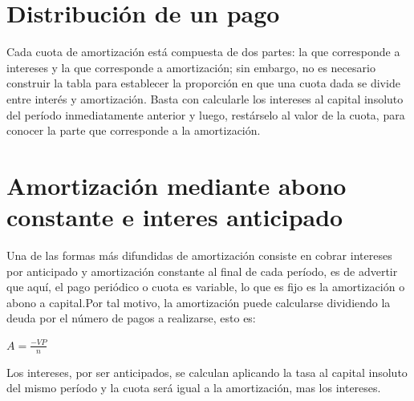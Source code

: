 	\section{Distribución de un pago}
	
	Cada cuota de amortización está compuesta de dos partes: la que corresponde a intereses y la que corresponde a amortización; sin embargo, no es necesario construir la tabla para establecer la proporción en que una cuota dada se divide entre interés y amortización. Basta con calcularle los intereses al capital insoluto del período inmediatamente anterior y luego, restárselo al valor de la cuota, para conocer la parte que corresponde a la amortización. \\
	
	
 
	
	
	\section{Amortización mediante abono constante e interes anticipado}
	
	Una de las formas más difundidas de amortización consiste en cobrar intereses por anticipado y amortización constante al final de cada período, es de advertir que aquí, el pago periódico o cuota es variable, lo que es fijo es la amortización o abono a capital.Por tal motivo, la amortización puede calcularse dividiendo la deuda por el número de pagos a realizarse, esto es:
	\begin{center}
		$A=\frac{-VP}{n}$
	\end{center}
	Los intereses, por ser anticipados, se calculan aplicando la tasa al capital insoluto del mismo período y la cuota será igual a la amortización, mas los intereses. \\
	
	
	
	
	
